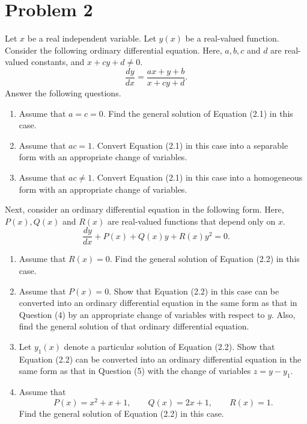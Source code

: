 \documentclass[10pt,a4paper]{article}
\begin{document}
\section*{Problem 2}

Let $x$ be a real independent variable. Let $y(x)$ be a real-valued function. Consider the following ordinary differential equation. Here, $a,b,c$ and $d$ are real-valued constants, and $x+cy+d\neq 0$.
\[
  \frac{dy}{dx}
  =
  \frac{ax+y+b}{x+cy+d}.
  \tag{2.1}
\]
Answer the following questions.

\begin{enumerate}
  \item Assume that $a=c=0$. Find the general solution of Equation (2.1) in this case.

  \item Assume that $ac=1$. Convert Equation (2.1) in this case into a separable form with an appropriate change of variables.

  \item Assume that $ac\neq 1$. Convert Equation (2.1) in this case into a homogeneous form with an appropriate change of variables.
\end{enumerate}

Next, consider an ordinary differential equation in the following form. Here, $P(x),Q(x)$ and $R(x)$ are real-valued functions that depend only on $x$.
\[
  \frac{dy}{dx}+P(x)+Q(x)y+R(x)y^2=0.
  \tag{2.2}
\]

\begin{enumerate}[resume]
  \item Assume that $R(x)=0$. Find the general solution of Equation (2.2) in this case.

  \item Assume that $P(x)=0$. Show that Equation (2.2) in this case can be converted into an ordinary differential equation in the same form as that in Question (4) by an appropriate change of variables with respect to $y$. Also, find the general solution of that ordinary differential equation.

  \item Let $y_1(x)$ denote a particular solution of Equation (2.2). Show that Equation (2.2) can be converted into an ordinary differential equation in the same form as that in Question (5) with the change of variables $z=y-y_1$.

  \item Assume that
        \[
          P(x)=x^2+x+1,\qquad Q(x)=2x+1,\qquad R(x)=1.
        \]
        Find the general solution of Equation (2.2) in this case.
\end{enumerate}
\end{document}
